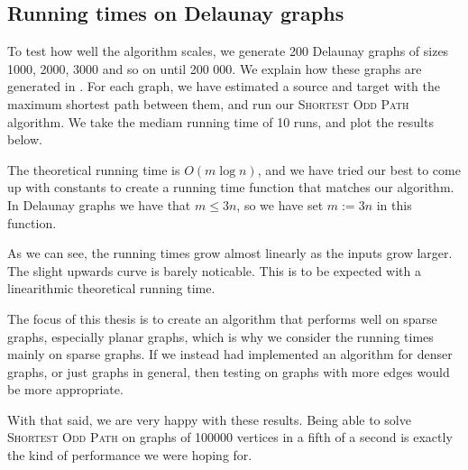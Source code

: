 \subsection{Running times on Delaunay graphs}
\label{subsubsection:odd-path-delaunay-testing}
To test how well the algorithm scales, we generate 200 Delaunay graphs of sizes 1000, 2000, 3000 and so on until 200 000. We explain how these graphs are generated in . For each graph, we have estimated a source and target with the maximum shortest path between them, and run our \textsc{Shortest Odd Path} algorithm. We take the mediam running time of 10 runs, and plot the results below.

The theoretical running time is $O(m \log n)$, and we have tried our best to come up with constants to create a running time function that matches our algorithm. In Delaunay graphs we have that $m \leq 3n$, so we have set $m := 3n$ in this function.

\begin{center}
    
\end{center}

As we can see, the running times grow almost linearly as the inputs grow larger. The slight upwards curve is barely noticable. This is to be expected with a linearithmic theoretical running time.

The focus of this thesis is to create an algorithm that performs well on sparse graphs, especially planar graphs, which is why we consider the running times mainly on sparse graphs. If we instead had implemented an algorithm for denser graphs, or just graphs in general, then testing on graphs with more edges would be more appropriate.

With that said, we are very happy with these results. Being able to solve \textsc{Shortest Odd Path} on graphs of 100000 vertices in a fifth of a second is exactly the kind of performance we were hoping for.
